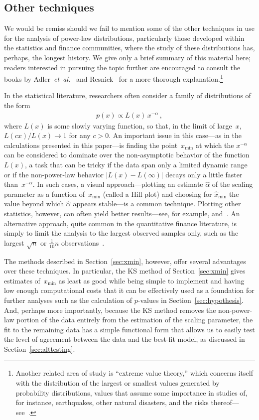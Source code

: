 \documentclass[final]{siamltex}
\newcommand{\etal}{\textit{et~al.}}
\newcommand{\xmin}{\ensuremath{x_{\min}}}
\newcommand{\punctspace}{\,}
\begin{document}
\subsection{Other techniques}
We would be remiss should we fail to mention some of the other techniques
in use for the analysis of power-law distributions, particularly those
developed within the statistics and finance communities, where the study of
these distributions has, perhaps, the longest history.  We give only a
brief summary of this material here; readers interested in pursuing the
topic further are encouraged to consult the books by
Adler~\etal~\cite{Adler-Feldman-Taqqu-heavy-tails} and
Resnick~\cite{Resnick06} for a more thorough explanation.\footnote{Another
 related area of study is ``extreme value theory,'' which concerns itself
 with the distribution of the largest or smallest values generated by
 probability distributions, values that assume some importance in studies
 of, for instance, earthquakes, other natural disasters, and the risks
 thereof---see~\cite{de-Hann-Ferreria-extreme-values}.}

In the statistical literature, researchers often consider a family of
distributions of the form
\begin{align}
\label{eq:heavy}
p(x) \propto L(x)\,x^{-\alpha} \punctspace,
\end{align}
where $L(x)$ is some slowly varying function, so that, in the limit of
large~$x$, $L(cx)/L(x)\to 1$ for any $c>0$.  An important issue in this
case---as in the calculations presented in this paper---is finding the
point~$\xmin$ at which the $x^{-\alpha}$ can be considered to dominate over
the non-asymptotic behavior of the function~$L(x)$, a task that can be
tricky if the data span only a limited dynamic range or if the
non-power-law behavior $|L(x)-L(\infty)|$ decays only a little faster
than~$x^{-\alpha}$.  In such cases, a visual approach---plotting an
estimate $\hat{\alpha}$ of the scaling parameter as a function of~$\xmin$
(called a Hill plot) and choosing for $\hat{x}_{\min}$ the value beyond
which $\hat{\alpha}$ appears stable---is a common technique.  Plotting
other statistics, however, can often yield better results---see, for
example, \cite{Kratz96} and~\cite{Stoev-Michailidis-Taqqu-max-self-sim}.
An alternative approach, quite common in the quantitative finance
literature, is simply to limit the analysis to the largest observed samples
only, such as the largest $\sqrt{n}$ or $\frac{1}{10}n$
observations~\cite{Farmer04}.

The methods described in Section~\ref{sec:xmin}, however, offer several
advantages over these techniques.  In particular, the KS method of
Section~\ref{sec:xmin} gives estimates of~$\xmin$ as least as good while
being simple to implement and having low enough computational costs that it
can be effectively used as a foundation for further analyses such as the
calculation of $p$-values in Section~\ref{sec:hypothesis}.  And, perhaps
more importantly, because the KS method removes the non-power-law portion
of the data entirely from the estimation of the scaling parameter, the fit
to the remaining data has a simple functional form that allows us to easily
test the level of agreement between the data and the best-fit model, as
discussed in Section~\ref{sec:alttesting}.
\end{document}
